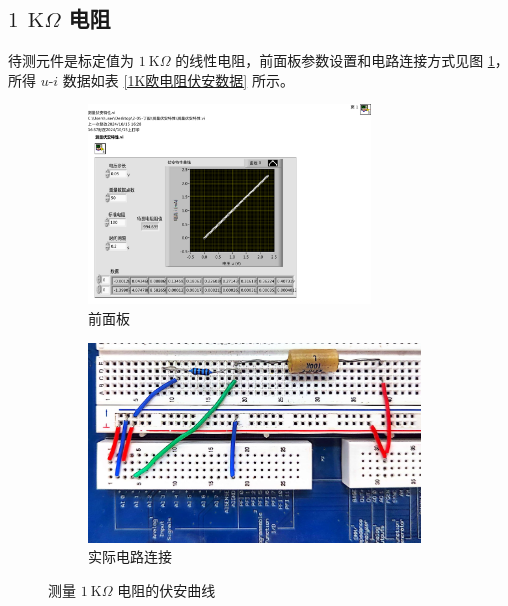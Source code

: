\documentclass[UTF8]{article}
\def\kO{\ \mathrm{K}\Omega}
\theoremstyle{MyLineTheoremStyle} %
\theoremstyle{MyBlockTheoremStyle} %
\theoremstyle{MySubsubsectionStyle} %
\begin{document}
\newpage
\subsection{$1\ \kO$ 电阻}

待测元件是标定值为 $1 \kO$ 的线性电阻，前面板参数设置和电路连接方式见图 \ref{测量1K欧电阻的伏安曲线}，所得 $u$-$i$ 数据如表 \ref{1K欧电阻伏安数据} 所示。

\begin{figure}[H]\centering
    \begin{subfigure}[b]{0.45\columnwidth}\centering
        \includegraphics[height=150pt]{assets/测量伏安曲线__1K欧电阻.pdf}
        \caption{前面板}
    \end{subfigure}\hfill
    \begin{subfigure}[b]{0.55\columnwidth}\centering
        \includegraphics[height=150pt]{assets/测量伏安曲线__1K欧电阻.jpg}
        \caption{实际电路连接}
    \end{subfigure}
    \caption{测量 $1 \kO$ 电阻的伏安曲线}
    \label{测量1K欧电阻的伏安曲线}
\end{figure}
\end{document}
